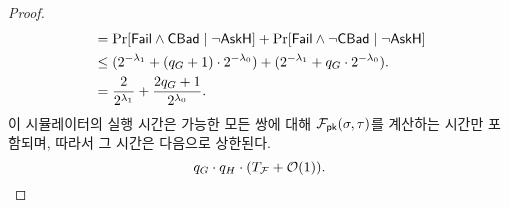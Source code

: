 \documentclass{article}
\theoremstyle{definition}
\begin{document}
\begin{proof}
\begin{align*}
		&= \Pr[\textsf{Fail} \land \textsf{CBad} \mid \neg\textsf{AskH}] + \Pr[\textsf{Fail} \land \neg\textsf{CBad} \mid \neg\textsf{AskH}] \\
		&\le (2^{-\lambda_1} + (q_{G} + 1) \cdot 2^{-\lambda_0}) + (2^{-\lambda_1} + q_{G} \cdot 2^{-\lambda_0}). \\
		&= \frac{2}{2^{\lambda_1}} + \frac{2q_{G} + 1}{2^{\lambda_0}}.
	\end{align*}
	이 시뮬레이터의 실행 시간은 가능한 모든 쌍에 대해 $\mathcal{F}_{\textsf{pk}}(\sigma, \tau)$를 계산하는 시간만 포함되며, 따라서 그 시간은 다음으로 상한된다.
	$$q_G \cdot q_H \cdot (T_{\mathcal{F}} + \mathcal{O}(1)).$$

\end{proof}

\end{document}
